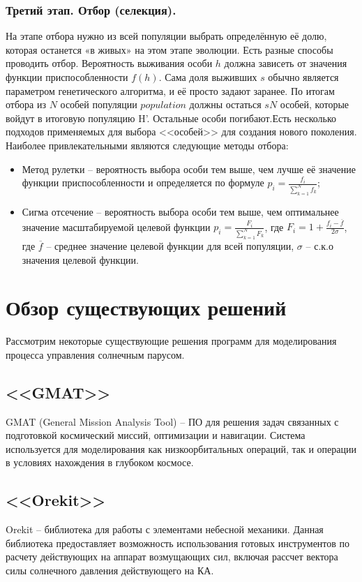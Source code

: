\subsubsection{Третий этап. Отбор (селекция).}
\noindent\indent На этапе отбора нужно из всей популяции выбрать определённую её
долю, которая останется «в живых» на этом этапе эволюции. Есть разные способы
проводить отбор. Вероятность выживания особи $h$ должна зависеть от значения функции
приспособленности $f(h)$. Сама доля выживших $s$ обычно является параметром
генетического алгоритма, и её просто задают заранее. По итогам отбора из $N$ особей
популяции $population$ должны остаться $sN$ особей, которые войдут в итоговую популяцию H'.
Остальные особи погибают.Есть несколько подходов применяемых для выбора <<особей>>
для создания нового поколения. Наиболее привлекательными являются следующие методы
отбора:
  \begin{itemize}
    \item Метод рулетки -- вероятность выбора особи тем выше, чем лучше её значение
функции приспособленности и определяется по формуле $p_i = \frac{f_i}{\sum\limits_{k=1}^{N}f_k}$;
    \item Сигма отсечение -- вероятность выбора особи тем выше, чем оптимальнее
значение масштабируемой целевой функции $p_i = \frac{F_i}{\sum\limits_{k=1}^{N}F_k}$,
где $F_i = 1 + \frac{f_i - \overline{f}}{2\sigma}$, где $\overline{f}$ -- среднее
значение целевой функции для всей популяции, $\sigma$ -- с.к.о значения целевой функции.
  \end{itemize}
\section{Обзор существующих решений}
\noindent\indent Рассмотрим некоторые существующие решения программ для моделирования
процесса управления солнечным парусом.
\subsection{<<GMAT>>}
\noindent\indent GMAT (General Mission Analysis Tool) -- ПО для решения задач связанных
с подготовкой космический миссий, оптимизации и навигации. Система используется для
моделирования как низкоорбитальных операций, так и операции в условиях нахождения
в глубоком космосе.
\subsection{<<Orekit>>}
\noindent\indent Orekit -- библиотека для работы с элементами небесной механики.
Данная библиотека предоставляет возможность использования готовых инструментов по расчету
действующих на аппарат возмущающих сил, включая рассчет вектора силы солнечного давления
действующего на КА.
